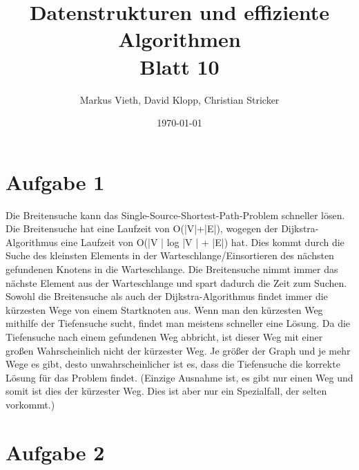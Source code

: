 \documentclass[a4paper,11pt,twoside]{scrartcl}
\title{Datenstrukturen und effiziente Algorithmen\\ Blatt 10}
\author{Markus Vieth, David Klopp, Christian Stricker}
\date{\today}
\begin{document}
\maketitle
\cleardoublepage
\pagestyle{myheadings}

\section*{Aufgabe 1}

Die Breitensuche kann das Single-Source-Shortest-Path-Problem schneller lösen. Die Breitensuche hat eine Laufzeit von O(|V|+|E|), wogegen der Dijkstra-Algorithmus eine Laufzeit von O(|V | log |V | + |E|) hat. Dies kommt durch die Suche des kleinsten Elements in der Warteschlange/Einsortieren des nächsten gefundenen Knotens in die Warteschlange. Die Breitensuche nimmt immer das nächste Element aus der Warteschlange und spart dadurch die Zeit zum Suchen. Sowohl die Breitensuche als auch der Dijkstra-Algorithmus findet immer die kürzesten Wege von einem Startknoten aus.
Wenn man den kürzesten Weg mithilfe der Tiefensuche sucht, findet man meistens schneller eine Lösung. Da die Tiefensuche nach einem gefundenen Weg abbricht, ist dieser Weg mit einer großen Wahrscheinlich nicht der kürzester Weg. Je größer der Graph und je mehr Wege es gibt, desto unwahrscheinlicher ist es, dass die Tiefensuche die korrekte Lösung für das Problem findet. (Einzige Ausnahme ist, es gibt nur einen Weg und somit ist dies der kürzester Weg. Dies ist aber nur ein Spezialfall, der selten vorkommt.) 

\newpage
 
\section*{Aufgabe 2}
\end{document}
